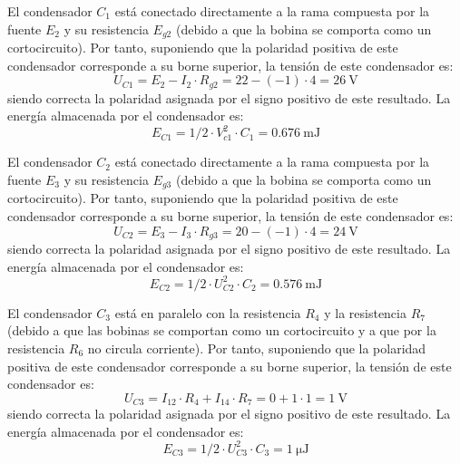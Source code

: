      El condensador $C_{1}$ está conectado directamente a la rama
     compuesta por la fuente $E_{2}$ y su resistencia $E_{g2}$ (debido
     a que la bobina se comporta como un cortocircuito). Por tanto,
     suponiendo que la polaridad positiva de este condensador
     corresponde a su borne superior, la tensión de este condensador
     es:
     \begin{equation*}
       U_{C1} = E_{2}-I_{2}\cdot R_{g2} = 22-(-1)\cdot4 = \qty{26}{\volt}
     \end{equation*}
     siendo correcta la polaridad asignada por el signo positivo de
     este resultado. La energía almacenada por el condensador es:
     \begin{equation*}
       E_{C1} = 1/2\cdot V_{c1}^{2}\cdot C_{1} = \qty{0.676}{\milli\joule}
     \end{equation*}

     El condensador $C_{2}$ está conectado directamente a la rama
     compuesta por la fuente $E_{3}$ y su resistencia $E_{g3}$ (debido
     a que la bobina se comporta como un cortocircuito). Por tanto,
     suponiendo que la polaridad positiva de este condensador
     corresponde a su borne superior, la tensión de este condensador
     es:
     \begin{equation*}
       U_{C2} = E_{3}-I_{3}\cdot R_{g3} = 20-(-1)\cdot4 = \qty{24}{\volt}
     \end{equation*}
     siendo correcta la polaridad asignada por el signo positivo de
     este resultado. La energía almacenada por el condensador es:
     \begin{equation*}
       E_{C2} = 1/2\cdot U_{C2}^{2}\cdot C_{2} = \qty{0.576}{\milli\joule}
     \end{equation*}

     El condensador $C_{3}$ está en paralelo con la resistencia
     $R_{4}$ y la resistencia $R_{7}$ (debido a que las bobinas se
     comportan como un cortocircuito y a que por la resistencia
     $R_{6}$ no circula corriente). Por tanto, suponiendo que la
     polaridad positiva de este condensador corresponde a su borne
     superior, la tensión de este condensador es:
     \begin{equation*}
       U_{C3} = I_{12}\cdot R_{4}+I_{14}\cdot R_{7} = 0+1\cdot1 = \qty{1}{\volt}
     \end{equation*}
     siendo correcta la polaridad asignada por el signo positivo de
     este resultado. La energía almacenada por el condensador es:
     \begin{equation*}
       E_{C3} = 1/2\cdot U_{C3}^{2}\cdot C_{3} = \qty{1}{\micro\joule}
     \end{equation*}

